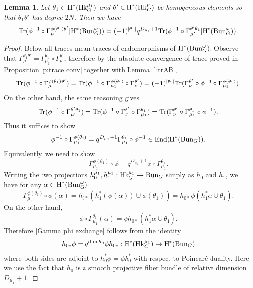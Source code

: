 \documentclass[reqno]{amsart}
\numberwithin{equation}{subsection}
\newtheorem{lemma}[subsubsection]{Lemma}
\theoremstyle{definition}
\newcommand{\Bun}{\textup{Bun}}
\newcommand\Hk{\mathrm{Hk}}
\newcommand{\Tr}{\textup{Tr}}
\newcommand\End{\textup{End}}
\renewcommand\c\circ
\newcommand{\cohog}[2]{\textup{H}^{#1}({#2})}     %
\renewcommand\a\alpha
\newcommand\G\Gamma
\renewcommand{\th}{\theta}
\newcommand{\om}{\omega}
\begin{document}
\begin{lemma}\label{l:partial Frob and trace} Let $\th_1\in \cohog{*}{\Hk^{\mu_1}_G}$ and $\th'\in \cohog{*}{\Hk^\nu_G}$ be homogeneous elements so that $\th_1\th'$ has degree $2N$. Then we have
\begin{equation*}
\Tr(\phi^{-1}\c\G^{\phi(\th_1)\th'}_{\mu}|\cohog{*}{\Bun^\om_G})=(-1)^{|\th_1|}q^{D_{\mu_1}+1}\Tr(\phi^{-1}\c\G^{\th'\th_1}_{\mu'}|\cohog{*}{\Bun^\om_G}).
\end{equation*}
\end{lemma}
\begin{proof}
    Below all traces mean traces of endomorphisms of $\cohog{*}{\Bun^\om_G}$.
    Observe that $\G^{\th_1\th'}_\mu=\G^{\th_1}_{\mu_1}\c\G^{\th'}_{\nu}$, therefore by the absolute convergence of trace proved in Proposition \ref{p:trace conv} together with Lemma \ref{l:trAB},
    \begin{equation*}
        \Tr(\phi^{-1}\c\G^{\phi(\th_1)\th'}_\mu)=\Tr(\phi^{-1}\c\G^{\phi(\th_1)}_{\mu_1}\c\G^{\th'}_{\nu})=(-1)^{|\th_1|}\Tr(\G^{\th'}_{\nu}\c\phi^{-1}\c\G^{\phi(\th_1)}_{\mu_1}).
    \end{equation*}
    On the other hand, the same reasoning gives
    \begin{equation*}
        \Tr(\phi^{-1}\c\G^{\th'\th_1}_{\mu'})=\Tr(\phi^{-1}\c\G^{\th'}_\nu\c\G^{\th_1}_{\mu_1})=\Tr(\G^{\th'}_\nu\c\G^{\th_1}_{\mu_1}\c\phi^{-1}).
    \end{equation*}
    Thus it suffices to show
    \begin{equation*}
        \phi^{-1}\c\G^{\phi(\th_1)}_{\mu_1}=q^{D_{\mu_1}+1}\G^{\th_1}_{\mu_1}\c\phi^{-1}\in \End(\cohog{*}{\Bun_G}).
    \end{equation*}
    Equivalently, we need to show
    \begin{equation}\label{Gamma phi exchange}
        \G^{\phi(\th_1)}_{\mu_1}\c\phi=q^{D_{\mu_1}+1}\phi\c\G^{\th_1}_{\mu_1}.
    \end{equation}
    Writing the two projections $h^{\mu_1}_0, h^{\mu_1}_1:\Hk^{\mu_1}_G\to \Bun_G$ simply as $h_0$ and $h_1$, we have for any $\a\in \cohog{*}{\Bun^\om_G}$
    \begin{equation*}
        \G^{\phi(\th_1)}_{\mu_1}\c\phi(\a)=h_{0*}(h_1^*(\phi(\a))\cup \phi(\th_1))=h_{0*}\phi(h_1^*\a\cup\th_1).
    \end{equation*}
    On the other hand,
    \begin{equation*}
        \phi\c\G^{\th_1}_{\mu_1}(\a)=\phi  h_{0*}(h_1^*\a\cup\th_1).
    \end{equation*}
    Therefore \eqref{Gamma phi exchange} follows from the identity 
    \begin{equation*}
        h_{0*}\phi=q^{\dim h_0}\phi  h_{0*}: \cohog{*}{\Hk^{\mu_1}_G}\to \cohog{*}{\Bun_G}
    \end{equation*}
    where both sides are adjoint to $h_0^*\phi=\phi h_0^*$ with respect to Poincar\'e duality. Here we use  
    the fact that $h_0$ is a smooth projective fiber bundle of relative dimension $D_{\mu_1}+1$.
\end{proof}
\end{document}
